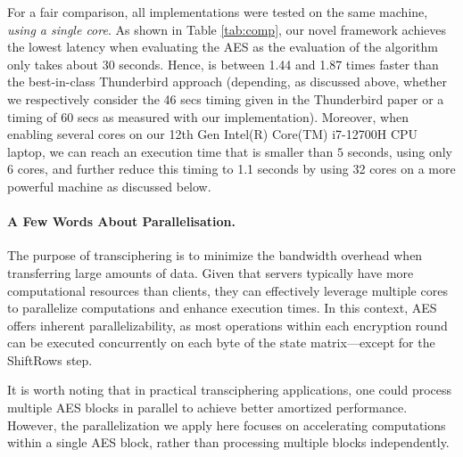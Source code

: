 For a fair comparison, all implementations were tested on the same machine, \emph{using a single core}. As shown in Table \ref{tab:comp}, our novel framework achieves the lowest latency when evaluating the \gls{AES} as the evaluation of the algorithm only takes about 30 seconds. Hence, \hippo{} is between 1.44 and 1.87 times faster than the best-in-class Thunderbird approach (depending, as discussed above, whether we respectively consider the 46 secs timing given in the Thunderbird paper or a timing of 60 secs as measured with our implementation).
Moreover, when enabling several cores on our 12th Gen Intel(R) Core(TM) i7-12700H CPU laptop, we can reach an execution time that is smaller than $5$ seconds, using only 6 cores, and further reduce this timing to 1.1 seconds by using 32 cores on a more powerful machine as discussed below.

\paragraph{A Few Words About Parallelisation.}
The purpose of transciphering is to minimize the bandwidth overhead when transferring large amounts of data. Given that servers typically have more computational resources than clients, they can effectively leverage multiple cores to parallelize computations and enhance execution times. In this context, \gls{AES} offers inherent parallelizability, as most operations within each encryption round can be executed concurrently on each byte of the state matrix—except for the ShiftRows step.

It is worth noting that in practical transciphering applications, one could process multiple \gls{AES} blocks in parallel to achieve better amortized performance. However, the parallelization we apply here focuses on accelerating computations within a single \gls{AES} block, rather than processing multiple blocks independently.

